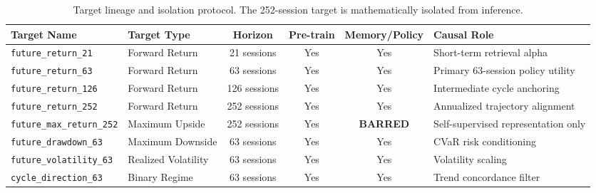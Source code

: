 \begin{table}[ht]
\centering
\small
\begin{tabular}{llcccl}
\toprule
\textbf{Target Name} & \textbf{Target Type} & \textbf{Horizon} & \textbf{Pre-train} & \textbf{Memory/Policy} & \textbf{Causal Role} \\
\midrule
\texttt{future\_return\_21} & Forward Return & 21 sessions & Yes & Yes & Short-term retrieval alpha \\
\texttt{future\_return\_63} & Forward Return & 63 sessions & Yes & Yes & Primary 63-session policy utility \\
\texttt{future\_return\_126} & Forward Return & 126 sessions & Yes & Yes & Intermediate cycle anchoring \\
\texttt{future\_return\_252} & Forward Return & 252 sessions & Yes & Yes & Annualized trajectory alignment \\
\texttt{future\_max\_return\_252} & Maximum Upside & 252 sessions & Yes & \textbf{BARRED} & Self-supervised representation only \\
\texttt{future\_drawdown\_63} & Maximum Downside & 63 sessions & Yes & Yes & CVaR risk conditioning \\
\texttt{future\_volatility\_63} & Realized Volatility & 63 sessions & Yes & Yes & Volatility scaling \\
\texttt{cycle\_direction\_63} & Binary Regime & 63 sessions & Yes & Yes & Trend concordance filter \\
\bottomrule
\end{tabular}
\caption{Target lineage and isolation protocol. The 252-session target is mathematically isolated from inference.}
\label{tab:target_lineage}
\end{table}
